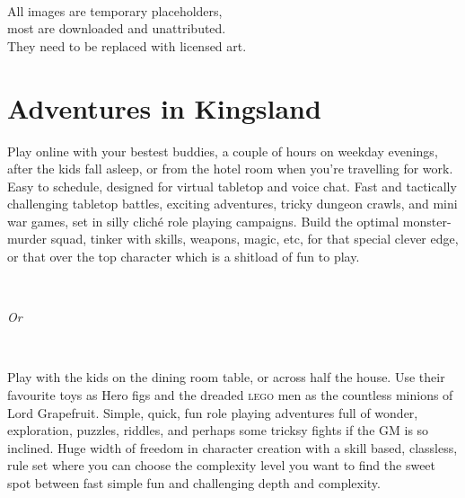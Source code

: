 \

\noindent
All images are temporary placeholders, \\
most are downloaded and unattributed.\\
They need to be replaced with licensed art.

\normalsize






\cleardoublepage
\pagestyle{fancy}
\raggedbottom






\section*{Adventures in Kingsland}

\noindent
Play online with your bestest buddies, a couple of hours on weekday evenings, after the kids fall asleep, or from the hotel room when you're travelling for work. Easy to schedule, designed for virtual tabletop and voice chat.
Fast and tactically challenging tabletop battles, exciting adventures, tricky dungeon crawls, and mini war games, set in silly cliché role playing campaigns. 
Build the optimal monster-murder squad, tinker with skills, weapons, magic, etc, for that special clever edge, or that over the top character which is a shitload of fun to play.

\

\emph{Or}

\

\noindent
Play with the kids on the dining room table, or across half the house. Use their favourite toys as Hero figs and the dreaded \textsc{lego} men as the countless minions of Lord Grapefruit.
Simple, quick, fun role playing adventures full of wonder, exploration, puzzles, riddles, and perhaps some tricksy fights if the GM is so inclined. 
Huge width of freedom in character creation with a skill based, classless, rule set where you can choose the complexity level you want to find the sweet spot between fast simple fun and challenging depth and complexity.

